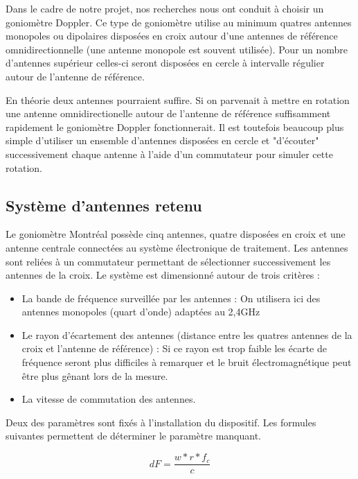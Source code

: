 	Dans le cadre de notre projet, nos recherches nous ont conduit à choisir un goniomètre Doppler. Ce type de goniomètre utilise au minimum quatres antennes monopoles ou dipolaires disposées en croix autour d'une antennes de référence omnidirectionnelle (une antenne monopole est souvent utilisée). Pour un nombre d'antennes supérieur celles-ci seront disposées en cercle à intervalle régulier autour de l'antenne de référence.	
	
	En théorie deux antennes pourraient suffire. Si on parvenait à mettre en rotation une antenne omnidirectionelle autour de l'antenne de référence suffisamment rapidement le goniomètre Doppler fonctionnerait. Il est toutefois beaucoup plus simple d'utiliser un ensemble d'antennes disposées en cercle et "d'écouter" successivement chaque antenne à l'aide d'un commutateur pour simuler cette rotation.
	
\subsection{Système d'antennes retenu}

	Le goniomètre Montréal possède cinq antennes, quatre disposées en croix et une antenne centrale connectées au système électronique de traitement. Les antennes sont reliées à un commutateur permettant de sélectionner successivement les antennes de la croix. Le système est dimensionné autour de trois critères : 
	
\begin{itemize}

\item La bande de fréquence surveillée par les antennes : On utilisera ici des antennes monopoles (quart d'onde) adaptées au 2,4GHz

\item Le rayon d'écartement des antennes (distance entre les quatres antennes de la croix et l'antenne de référence) : Si ce rayon est trop faible les écarte de fréquence seront plus difficiles à remarquer et le bruit électromagnétique peut être plus gênant lors de la mesure.


\item La vitesse de commutation des antennes.

\end{itemize}

Deux des paramètres sont fixés à l'installation du dispositif. Les formules suivantes permettent de déterminer le paramètre manquant.

\begin{equation}
dF = \frac{w*r*f_c}{c}
\end{equation}

